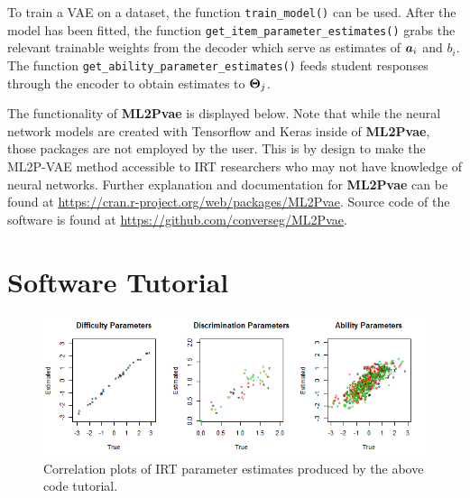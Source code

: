 To train a VAE on a dataset, the function {\color{blue}\verb!train_model()!} can be used. After the model has been fitted, the function {\color{blue}\verb!get_item_parameter_estimates()!} grabs the relevant trainable weights from the decoder which serve as estimates of $\boldsymbol{a}_i$ and $b_i$. The function {\color{blue}\verb!get_ability_parameter_estimates()!} feeds student responses through the encoder to obtain estimates to $\boldsymbol{\Theta}_j$.

The functionality of \textbf{ML2Pvae} is displayed below. Note that while the neural network models are created with Tensorflow and Keras \cite{keras_r} inside of \textbf{ML2Pvae}, those packages are not employed by the user. This is by design to make the ML2P-VAE method accessible to IRT researchers who may not have knowledge of neural networks. Further explanation and documentation for \textbf{ML2Pvae} can be found at {\color{violet}\href{https://cran.r-project.org/web/packages/ML2Pvae}{https://cran.r-project.org/web/packages/ML2Pvae}}. Source code of the software is found at {\color{violet}\href{https://github.com/converseg/ML2Pvae}{https://github.com/converseg/ML2Pvae}}.

\section{Software Tutorial}
\vspace{.5cm}


\begin{figure}[h]
  \centering
  \includegraphics[width=.95\textwidth]{img/ml2pvae_tutorial_plots.png}
  \caption{Correlation plots of IRT parameter estimates produced by the above code tutorial.}
  \label{fig:tutorial_plots}
\end{figure}




